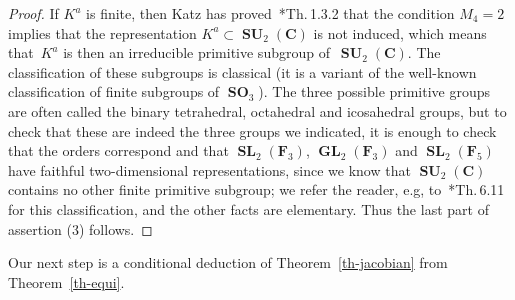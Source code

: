 \documentclass[12pt]{amsart}
\numberwithin{equation}{section}
\newcommand{\Cc}{\mathbf{C}}
\newcommand{\Ff}{\mathbf{F}}
\DeclareMathOperator{\SL}{\mathbf{SL}}
\DeclareMathOperator{\GL}{\mathbf{GL}}
\DeclareMathOperator{\SO}{\mathbf{SO}}
\DeclareMathOperator{\SU}{\mathbf{SU}}
\theoremstyle{plain}
\theoremstyle{remark}
\theoremstyle{definition}
\begin{document}
\begin{proof}
  If $K^a$ is finite, then Katz has
  proved~\cite{katz-larsen}*{Th.\,1.3.2} that the condition
  $M_4=2$ implies that the representation $K^a\subset \SU_2(\Cc)$ is
  not induced, which means that~$K^a$ is then an irreducible primitive
  subgroup of~$\SU_2(\Cc)$. The classification of these subgroups is
  classical (it is a variant of the well-known classification of
  finite subgroups of $\SO_3$). The three possible primitive groups
  are often called the binary tetrahedral, octahedral and icosahedral
  groups, but to check that these are indeed the three groups we
  indicated, it is enough to check that the orders correspond and that
  $\SL_2(\Ff_3)$, $\GL_2(\Ff_3)$ and $\SL_2(\Ff_5)$ have faithful
  two-dimensional representations, since we know that $\SU_2(\Cc)$
  contains no other finite primitive subgroup; we refer the reader, e.g,
  to~\cite{leuschke-wiegand}*{Th.\,6.11} for this classification, and
  the other facts are elementary.  Thus the last part of assertion (3)
  follows.
\end{proof}

Our next step is a conditional deduction of Theorem~\ref{th-jacobian}
from Theorem~\ref{th-equi}.
\end{document}
